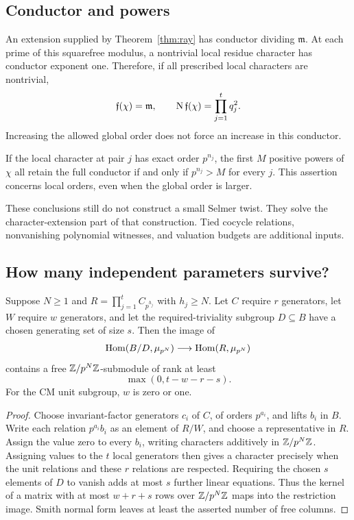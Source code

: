 \subsection{Conductor and powers}

An extension supplied by Theorem~\ref{thm:ray} has conductor dividing $\mathfrak m$. At each prime of this squarefree modulus, a nontrivial local residue character has conductor exponent one. Therefore, if all prescribed local characters are nontrivial,
\begin{equation}\label{eq:conductor}
 \mathfrak f(\chi)=\mathfrak m,\qquad
 \operatorname{N}\mathfrak f(\chi)=\prod_{j=1}^t q_j^2.
\end{equation}
Increasing the allowed global order does not force an increase in this conductor.

If the local character at pair $j$ has exact order $p^{n_j}$, the first $M$ positive powers of $\chi$ all retain the full conductor if and only if $p^{n_j}>M$ for every $j$. This assertion concerns local orders, even when the global order is larger.

These conclusions still do not construct a small Selmer twist. They solve the character-extension part of that construction. Tied cocycle relations, nonvanishing polynomial witnesses, and valuation budgets are additional inputs.

\subsection{How many independent parameters survive?}

\begin{proposition}\label{prop:grid}
Suppose $N\ge1$ and $R=\prod_{j=1}^t C_{p^{h_j}}$ with $h_j\ge N$. Let $C$ require $r$ generators, let $W$ require $w$ generators, and let the required-triviality subgroup $D\subseteq B$ have a chosen generating set of size $s$. Then the image of
\[
 \operatorname{Hom}(B/D,\mu_{p^N})\longrightarrow\operatorname{Hom}(R,\mu_{p^N})
\]
contains a free $\mathbb Z/p^N\mathbb Z$-submodule of rank at least
\[
                     \max(0,t-w-r-s).
\]
For the CM unit subgroup, $w$ is zero or one.
\end{proposition}

\begin{proof}
Choose invariant-factor generators $c_i$ of $C$, of orders $p^{a_i}$, and lifts $b_i$ in $B$. Write each relation $p^{a_i}b_i$ as an element of $R/W$, and choose a representative in $R$. Assign the value zero to every $b_i$, writing characters additively in $\mathbb Z/p^N\mathbb Z$. Assigning values to the $t$ local generators then gives a character precisely when the unit relations and these $r$ relations are respected. Requiring the chosen $s$ elements of $D$ to vanish adds at most $s$ further linear equations. Thus the kernel of a matrix with at most $w+r+s$ rows over $\mathbb Z/p^N\mathbb Z$ maps into the restriction image. Smith normal form leaves at least the asserted number of free columns.
\end{proof}

